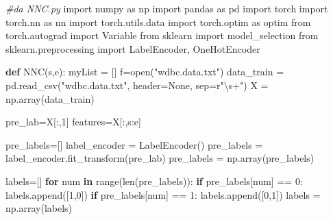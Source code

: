 \documentclass[11pt]{article}
\newenvironment{Shaded}{}{}
\newcommand{\KeywordTok}[1]{\textcolor[rgb]{0.00,0.44,0.13}{\textbf{{#1}}}}
\newcommand{\DecValTok}[1]{\textcolor[rgb]{0.25,0.63,0.44}{{#1}}}
\newcommand{\StringTok}[1]{\textcolor[rgb]{0.25,0.44,0.63}{{#1}}}
\newcommand{\CommentTok}[1]{\textcolor[rgb]{0.38,0.63,0.69}{\textit{{#1}}}}
\newcommand{\NormalTok}[1]{{#1}}
\newcommand{\VerbatimStringTok}[1]{\textcolor[rgb]{0.25,0.44,0.63}{{#1}}}
\newcommand{\ImportTok}[1]{{#1}}
\newcommand{\VariableTok}[1]{\textcolor[rgb]{0.10,0.09,0.49}{{#1}}}
\newcommand{\ControlFlowTok}[1]{\textcolor[rgb]{0.00,0.44,0.13}{\textbf{{#1}}}}
\newcommand{\OperatorTok}[1]{\textcolor[rgb]{0.40,0.40,0.40}{{#1}}}
\newcommand{\BuiltInTok}[1]{{#1}}
\begin{document}
\begin{Shaded}
\begin{Highlighting}[]
\CommentTok{#da NNC.py}
\ImportTok{import}\NormalTok{ numpy }\ImportTok{as}\NormalTok{ np}
\ImportTok{import}\NormalTok{ pandas }\ImportTok{as}\NormalTok{ pd}
\ImportTok{import}\NormalTok{ torch}
\ImportTok{import}\NormalTok{ torch.nn }\ImportTok{as}\NormalTok{ nn}
\ImportTok{import}\NormalTok{ torch.utils.data}
\ImportTok{import}\NormalTok{ torch.optim }\ImportTok{as}\NormalTok{ optim}
\ImportTok{from}\NormalTok{ torch.autograd }\ImportTok{import}\NormalTok{ Variable}
\ImportTok{from}\NormalTok{ sklearn }\ImportTok{import}\NormalTok{ model_selection}
\ImportTok{from}\NormalTok{ sklearn.preprocessing }\ImportTok{import}\NormalTok{ LabelEncoder, OneHotEncoder}

\KeywordTok{def}\NormalTok{ NNC(s,e):}
\NormalTok{    myList }\OperatorTok{=}\NormalTok{ []}
\NormalTok{    f}\OperatorTok{=}\BuiltInTok{open}\NormalTok{(}\StringTok{"wdbc.data.txt"}\NormalTok{)}
\NormalTok{    data_train }\OperatorTok{=}\NormalTok{ pd.read_csv(}\StringTok{"wdbc.data.txt"}\NormalTok{, header}\OperatorTok{=}\VariableTok{None}\NormalTok{, sep}\OperatorTok{=}\VerbatimStringTok{r"\textbackslash{}s+"}\NormalTok{)}
\NormalTok{    X }\OperatorTok{=}\NormalTok{ np.array(data_train)}
    
\NormalTok{    pre_lab}\OperatorTok{=}\NormalTok{X[:,}\DecValTok{1}\NormalTok{]  }
\NormalTok{    features}\OperatorTok{=}\NormalTok{X[:,s:e]}
    
\NormalTok{    pre_labels}\OperatorTok{=}\NormalTok{[]}
\NormalTok{    label_encoder }\OperatorTok{=}\NormalTok{ LabelEncoder()                                  }
\NormalTok{    pre_labels }\OperatorTok{=}\NormalTok{ label_encoder.fit_transform(pre_lab)}
\NormalTok{    pre_labels }\OperatorTok{=}\NormalTok{ np.array(pre_labels)}
    
\NormalTok{    labels}\OperatorTok{=}\NormalTok{[]}
    \ControlFlowTok{for}\NormalTok{ num }\KeywordTok{in} \BuiltInTok{range}\NormalTok{(}\BuiltInTok{len}\NormalTok{(pre_labels)):}
        \ControlFlowTok{if}\NormalTok{ pre_labels[num] }\OperatorTok{==} \DecValTok{0}\NormalTok{:}
\NormalTok{            labels.append([}\DecValTok{1}\NormalTok{,}\DecValTok{0}\NormalTok{])}
        \ControlFlowTok{if}\NormalTok{ pre_labels[num] }\OperatorTok{==} \DecValTok{1}\NormalTok{:}
\NormalTok{            labels.append([}\DecValTok{0}\NormalTok{,}\DecValTok{1}\NormalTok{])}
\NormalTok{    labels }\OperatorTok{=}\NormalTok{ np.array(labels)}
    

\end{Highlighting}
\end{Shaded}
\end{document}
